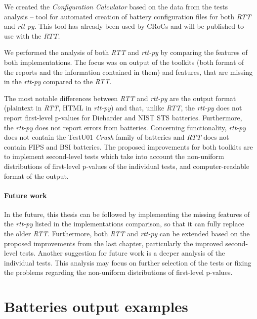 \documentclass[
  digital,     %
  oneside,     %
  nosansbold,  %
  nocolorbold, %
  nolof,         %
  nolot,         %
]{fithesis4}
\begin{document}
We created the \emph{Configuration Calculator} based on the data from the tests analysis -- tool for automated creation of battery configuration files for both \emph{RTT} and \emph{rtt-py}. This tool has already been used by CRoCs and will be published to use with the \emph{RTT}.

We performed the analysis of both \emph{RTT} and \emph{rtt-py} by comparing the features of both implementations. The focus was on output of the toolkits (both format of the reports and the information contained in them) and features, that are missing in the \emph{rtt-py} compared to the \emph{RTT}.

 The most notable differences between \emph{RTT} and \emph{rtt-py} are the output format (plaintext in \emph{RTT}, HTML in \emph{rtt-py}) and that, unlike \emph{RTT}, the \emph{rtt-py} does not report first-level p-values for Dieharder and NIST STS batteries. Furthermore, the \emph{rtt-py} does not report errors from batteries. Concerning functionality, \emph{rtt-py} does not contain the TestU01 \emph{Crush} family of batteries and \emph{RTT} does not contain FIPS and BSI batteries. The proposed improvements for both toolkits are to implement second-level tests which take into account the non-uniform distributions of first-level p-values of the individual tests, and computer-readable format of the output. 

\subsubsection{Future work}
In the future, this thesis can be followed by implementing the missing features of the \emph{rtt-py} listed in the implementations comparison, so that it can fully replace the older \emph{RTT}. Furthermore, both \emph{RTT} and \emph{rtt-py} can be extended based on the proposed improvements from the last chapter, particularly the improved second-level tests. 
Another suggestion for future work is a deeper analysis of the individual tests. This analysis may focus on further selection of the tests or fixing the problems regarding the non-uniform distributions of first-level p-values.


\appendix 

\chapter{Batteries output examples} \label{append:dieharder-output}
\end{document}
